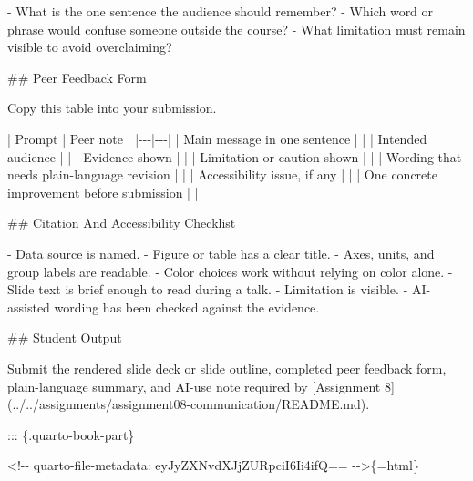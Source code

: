 \documentclass[
  letterpaper,
  DIV=11,
  numbers=noendperiod,
  oneside]{scrreprt}
\newenvironment{Shaded}{\begin{snugshade}}{\end{snugshade}}
\newcommand{\CommentTok}[1]{\textcolor[rgb]{0.37,0.37,0.37}{#1}}
\newcommand{\FunctionTok}[1]{\textcolor[rgb]{0.28,0.35,0.67}{#1}}
\newcommand{\InformationTok}[1]{\textcolor[rgb]{0.37,0.37,0.37}{#1}}
\newcommand{\NormalTok}[1]{\textcolor[rgb]{0.00,0.23,0.31}{#1}}
\newcommand{\OtherTok}[1]{\textcolor[rgb]{0.00,0.23,0.31}{#1}}
\newcommand{\PreprocessorTok}[1]{\textcolor[rgb]{0.68,0.00,0.00}{#1}}
\newcommand{\SpecialStringTok}[1]{\textcolor[rgb]{0.13,0.47,0.30}{#1}}
\begin{document}
\begin{Shaded}
\begin{Highlighting}[numbers=left,,]
\SpecialStringTok{{-} }\NormalTok{What is the one sentence the audience should remember?}
\SpecialStringTok{{-} }\NormalTok{Which word or phrase would confuse someone outside the course?}
\SpecialStringTok{{-} }\NormalTok{What limitation must remain visible to avoid overclaiming?}

\FunctionTok{\#\# Peer Feedback Form}

\NormalTok{Copy this table into your submission.}

\PreprocessorTok{|}\NormalTok{ Prompt }\PreprocessorTok{|}\NormalTok{ Peer note }\PreprocessorTok{|}
\PreprocessorTok{|{-}{-}{-}|{-}{-}{-}|}
\PreprocessorTok{|}\NormalTok{ Main message in one sentence }\PreprocessorTok{|}  \PreprocessorTok{|}
\PreprocessorTok{|}\NormalTok{ Intended audience }\PreprocessorTok{|}  \PreprocessorTok{|}
\PreprocessorTok{|}\NormalTok{ Evidence shown }\PreprocessorTok{|}  \PreprocessorTok{|}
\PreprocessorTok{|}\NormalTok{ Limitation or caution shown }\PreprocessorTok{|}  \PreprocessorTok{|}
\PreprocessorTok{|}\NormalTok{ Wording that needs plain{-}language revision }\PreprocessorTok{|}  \PreprocessorTok{|}
\PreprocessorTok{|}\NormalTok{ Accessibility issue, if any }\PreprocessorTok{|}  \PreprocessorTok{|}
\PreprocessorTok{|}\NormalTok{ One concrete improvement before submission }\PreprocessorTok{|}  \PreprocessorTok{|}

\FunctionTok{\#\# Citation And Accessibility Checklist}

\SpecialStringTok{{-} }\NormalTok{Data source is named.}
\SpecialStringTok{{-} }\NormalTok{Figure or table has a clear title.}
\SpecialStringTok{{-} }\NormalTok{Axes, units, and group labels are readable.}
\SpecialStringTok{{-} }\NormalTok{Color choices work without relying on color alone.}
\SpecialStringTok{{-} }\NormalTok{Slide text is brief enough to read during a talk.}
\SpecialStringTok{{-} }\NormalTok{Limitation is visible.}
\SpecialStringTok{{-} }\NormalTok{AI{-}assisted wording has been checked against the evidence.}

\FunctionTok{\#\# Student Output}

\NormalTok{Submit the rendered slide deck or slide outline, completed peer feedback form, plain{-}language summary, and AI{-}use note required by }\CommentTok{[}\OtherTok{Assignment 8}\CommentTok{](../../assignments/assignment08{-}communication/README.md)}\NormalTok{.}


\NormalTok{::: \{.quarto{-}book{-}part\}}


\InformationTok{\textasciigrave{}\textless{}!{-}{-} quarto{-}file{-}metadata: eyJyZXNvdXJjZURpciI6Ii4ifQ== {-}{-}\textgreater{}\textasciigrave{}}\NormalTok{\{=html\}}


\end{Highlighting}
\end{Shaded}
\end{document}
